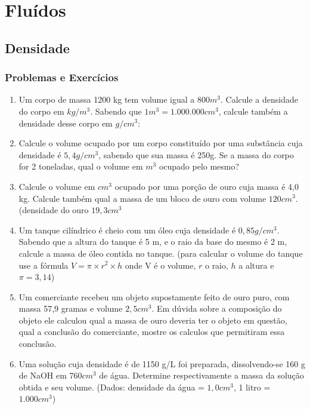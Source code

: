 \documentclass[12pt,a4paper]{book}
\begin{document}
\chapter{Fluídos}
	\section{Densidade}
	
		\newpage \subsection{Problemas e Exercícios}
		\begin{enumerate}
		\item Um corpo de massa 1200 kg tem volume igual a $800 m^3$. Calcule a densidade do corpo em $kg/m^3$. Sabendo que $ 1 m^3 = 1.000.000 cm^3$, calcule também a densidade desse corpo em $g/cm^3$:
				
		\item Calcule o volume ocupado por um corpo constituído por uma substância cuja densidade é $5,4g/cm^3$, sabendo que sua massa é 250g. Se a massa do corpo for 2 toneladas, qual o volume em $m^3$ ocupado pelo mesmo?
			
		\item Calcule o volume em $cm^3$ ocupado por uma porção de ouro cuja massa é 4,0 kg. Calcule também qual a massa de um bloco de ouro com volume $120 cm^3$. (densidade do ouro $19,3 cm^3$ 
		
		\item Um tanque cilíndrico é cheio com um óleo cuja densidade é $0,85 g/cm^3$. Sabendo que a altura do tanque é 5 m, e o raio da base do mesmo é 2 m, calcule a massa de óleo contida no tanque. (para calcular o volume do tanque use a fórmula $V=\pi \times r^2 \times h$ onde V é o volume, $r$ o raio, $h$ a altura e $\pi=3,14$)
		
		\item Um comerciante recebeu um objeto supostamente feito de ouro puro, com massa 57,9 gramas e volume $2,5 cm^3$. Em dúvida sobre a composição do objeto ele calculou qual a massa de ouro deveria ter o objeto em questão, qual a conclusão do comerciante, mostre os calculos que permitiram essa conclusão. 
		
		\item Uma solução cuja densidade é de 1150 g/L foi preparada, dissolvendo-se 160 g de NaOH em $760 cm^3$ de água. Determine respectivamente a massa da solução obtida e seu volume. (Dados: densidade da água = $1,0 cm^3$, 1 litro = $1.000 cm^3$)
		

\end{enumerate}
\end{document}
